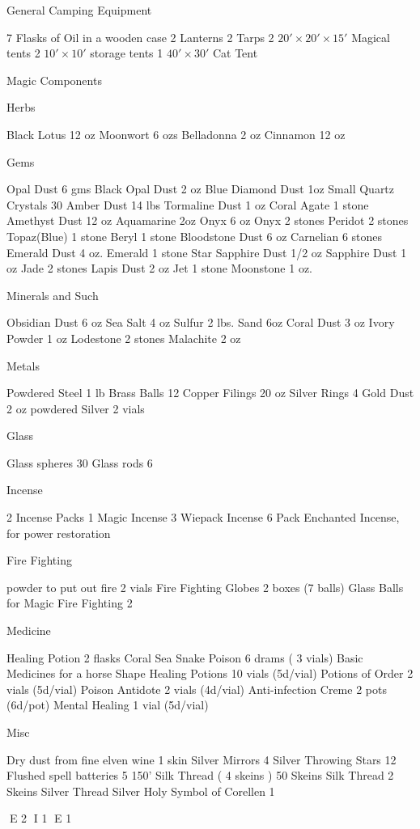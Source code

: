 General Camping Equipment


7 Flasks of Oil in a wooden case
2 Lanterns
2 Tarps
2 $ 20' \times 20' \times 15' $ Magical tents
2 $ 10' \times 10' $ storage tents
1 $ 40' \times 30' $ Cat Tent

Magic Components

Herbs

Black Lotus  12 oz
Moonwort     6 ozs
Belladonna   2 oz
Cinnamon     12 oz

Gems

Opal Dust          6 gms
Black Opal Dust    2 oz
Blue Diamond Dust  1oz
Small Quartz Crystals  30
Amber Dust         14 lbs
Tormaline Dust     1 oz
Coral Agate        1 stone
Amethyst Dust      12 oz
Aquamarine         2oz
Onyx               6 oz
Onyx               2 stones
Peridot               2 stones
Topaz(Blue)               1 stone
Beryl               1 stone
Bloodstone               Dust 6 oz
Carnelian               6 stones
Emerald Dust               4 oz.
Emerald               1 stone
Star Sapphire Dust               1/2 oz
Sapphire Dust               1 oz
Jade               2 stones
Lapis Dust               2 oz
Jet               1 stone
Moonstone               1 oz.

Minerals and Such

Obsidian Dust               6 oz
Sea Salt               4 oz
Sulfur               2 lbs.
Sand               6oz
Coral Dust               3 oz
Ivory Powder               1 oz
Lodestone               2 stones
Malachite               2 oz

Metals

Powdered Steel               1 lb
Brass Balls               12
Copper Filings               20 oz
Silver Rings              4
Gold Dust               2 oz
powdered Silver         2 vials

Glass

Glass spheres  30
Glass rods  6

Incense

2               Incense Packs
1               Magic Incense
3               Wiepack Incense
6               Pack Enchanted Incense, for power restoration

Fire Fighting


powder to put out fire  2 vials
Fire Fighting Globes  2 boxes (7 balls)
Glass Balls for Magic Fire Fighting  2


Medicine


Healing Potion  2 flasks
Coral Sea Snake Poison  6 drams ( 3 vials)
Basic Medicines for a horse
Shape Healing Potions  10 vials (5d/vial)
Potions of Order  2 vials (5d/vial)
Poison Antidote  2 vials (4d/vial)
Anti-infection Creme  2 pots (6d/pot)
Mental Healing  1 vial (5d/vial)

Misc

Dry dust from fine elven wine  1 skin
Silver Mirrors  4
Silver Throwing Stars  12
Flushed spell batteries  5
150' Silk Thread   ( 4 skeins )
50 Skeins Silk Thread
2 Skeins Silver Thread
Silver Holy Symbol of Corellen  1


E 2
I 1
E 1

